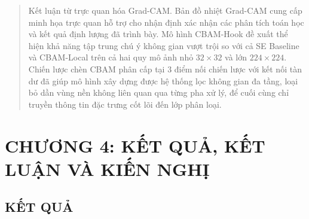 \documentclass[
  12pt,
  a4paper,
]{report}
\begin{document}
\begin{quote}
Kết luận từ trực quan hóa Grad-CAM. Bản đồ nhiệt Grad-CAM cung cấp minh
họa trực quan hỗ trợ cho nhận định xác nhận các phân tích toán học và
kết quả định lượng đã trình bày. Mô hình CBAM-Hook đề xuất thể hiện khả
năng tập trung chú ý không gian vượt trội so với cả SE Baseline và
CBAM-Local trên cả hai quy mô ảnh nhỏ \(32 \times 32\) và lớn
\(224 \times 224\). Chiến lược chèn CBAM phân cấp tại 3 điểm nối chiến
lược với kết nối tàn dư đã giúp mô hình xây dựng được hệ thống lọc không
gian đa tầng, loại bỏ dần vùng nền không liên quan qua từng pha xử lý,
để cuối cùng chỉ truyền thông tin đặc trưng cốt lõi đến lớp phân loại.
\end{quote}

\chapter*{}\label{section-2}

\chapter*{CHƯƠNG 4: KẾT QUẢ, KẾT LUẬN VÀ KIẾN
NGHỊ}\label{chux1b0ux1a1ng-4-kux1ebft-quux1ea3-kux1ebft-luux1eadn-vuxe0-kiux1ebfn-nghux1ecb}

\section{KẾT QUẢ}\label{kux1ebft-quux1ea3}
\end{document}
